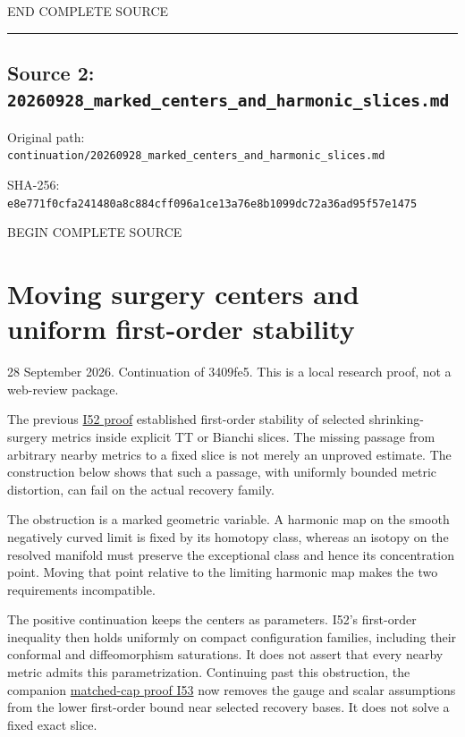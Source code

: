 \documentclass[
  10pt,
]{article}
\begin{document}
END COMPLETE SOURCE

\begin{center}\rule{0.5\linewidth}{0.5pt}\end{center}

\hypertarget{source-2-20260928_marked_centers_and_harmonic_slices.md}{%
\subsection{Source 2:
\nolinkurl{20260928_marked_centers_and_harmonic_slices.md}}\label{source-2-20260928_marked_centers_and_harmonic_slices.md}}

Original path:
\nolinkurl{continuation/20260928_marked_centers_and_harmonic_slices.md}

SHA-256:
\nolinkurl{e8e771f0cfa241480a8c884cff096a1ce13a76e8b1099dc72a36ad95f57e1475}

BEGIN COMPLETE SOURCE

\hypertarget{moving-surgery-centers-and-uniform-first-order-stability}{%
\section{Moving surgery centers and uniform first-order
stability}\label{moving-surgery-centers-and-uniform-first-order-stability}}

28 September 2026. Continuation of 3409fe5. This is a local research
proof, not a web-review package.

The previous
\href{20260927_endpoint_covariance_and_surgery_limits.md}{I52 proof}
established first-order stability of selected shrinking-surgery metrics
inside explicit TT or Bianchi slices. The missing passage from arbitrary
nearby metrics to a fixed slice is not merely an unproved estimate. The
construction below shows that such a passage, with uniformly bounded
metric distortion, can fail on the actual recovery family.

The obstruction is a marked geometric variable. A harmonic map on the
smooth negatively curved limit is fixed by its homotopy class, whereas
an isotopy on the resolved manifold must preserve the exceptional class
and hence its concentration point. Moving that point relative to the
limiting harmonic map makes the two requirements incompatible.

The positive continuation keeps the centers as parameters. I52's
first-order inequality then holds uniformly on compact configuration
families, including their conformal and diffeomorphism saturations. It
does not assert that every nearby metric admits this parametrization.
Continuing past this obstruction, the companion
\href{20260928_intrinsic_caps_and_stability.md}{matched-cap proof I53}
now removes the gauge and scalar assumptions from the lower first-order
bound near selected recovery bases. It does not solve a fixed exact
slice.
\end{document}
